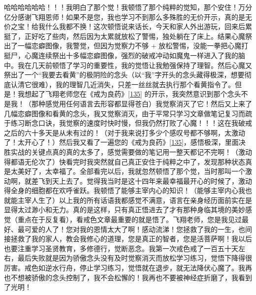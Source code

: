 \begin{case}
    哈哈哈哈哈哈！！！我明白了那个觉！我顿悟了那个纯粹的觉知，那个安住！万分亿分感谢飞翔恩师！如果不是您，我也学习不到那么多殊胜的无价开示，真的是无价之宝！给我什么我都不换！这次顿悟说来话长，今天和家人外出游玩，回来后累挺了，正好吃了些肉，然后因为太累就放松了警惕，独处躺在了床上。结果心魔祭出了一幅恋癖图像，我警觉，但因为觉察力不够 + 放松警惕，没能一拳把心魔打挺尸，心魔连续祭出十多幅恋癖图像，强烈的破戒冲动如魔鬼一样进入了我的脑中。我在几天前顿悟了学习的重要性，我的觉悟让我勉强保持了理智。然后心魔又祭出了一个“我要去看黄”的极阴险的念头（以“我”字开头的念头藏得极深，想要彻底认清它很难），我的理智几近消失，只差一丝丝就去执行那个看黄指令了。但是！我想起了飞翔老师您在《戒为良药》\ref{135} 的开示，我突然意识到那个念头不是我！（那种感觉用任何语言去形容都显得苍白）我觉察消灭了它！然后又上来了几幅恋癖图像和看黄的念头，我又觉察消灭，由于平常只学习文章做笔记复习而疏于练习断念口诀，我觉察的速度时快时慢，但我仍然打败了心魔！！！这在我破戒之后的六十多天是从未有过的！（对于我来说打多少个感叹号都不够啊，太激动了！太开心了！）然后我又看了一遍您的《戒为良药》\ref{135}，感悟极深，里面决胜实战的关键点真的真的太多了，感觉需要做的笔记用一整天都记不完啊！（激动得都语无伦次了）快看完时我突然就自己真正安住于纯粹之中了，发现那种状态真是太美好了，太幸福了。全部看完以后，我就忽然顿悟了那个觉，当时那叫一个激动啊，就差飞到天上去了。觉得我当时是这十四年来最幸福最开心的时候了，激动得全身的细胞都在欢呼雀跃。我顿悟了能够主宰内心的知识！（能够主宰内心我也就能主宰人生了）以上我的所有话语我都感觉不满意，语言在亲身经历面前实在是显得太过渺小和无力。真的是这样，只有真正悟进去了才有那种身临其境的美妙感觉（重点在于反复看），看戒色文章最重要的就是悟了。飞翔老师，您是我见过最好、最可爱的人了！您对我的恩情太大了啊！感动流涕！您拯救了我的一生，也间接拯救了我的家人，教会我修心的道理，您是真正的智者，您是活菩萨啊！我以后也要注重学习圣贤教育，多修德行，觉断恶念。我第一次戒色戒了一百五十天左右，最后失败就是因为骄傲念头没有及时觉察消灭而放松学习练习，觉悟下降得很厉害。戒色如逆水行舟，停止学习练习，觉悟就在退步，就无法降伏心魔了。我再也不想被骄傲的念头控制了，我不会松懈的！我再也不要被神经症折磨了，我看到了光明！


\end{case}
